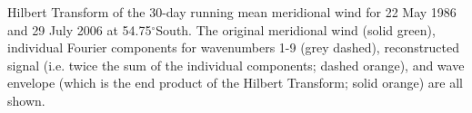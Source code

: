 \label{fig:example_hilbert}
Hilbert Transform of the 30-day running mean meridional wind for 22 May 1986 and 29 July 2006 at 54.75$^{\circ}$South. The original meridional wind (solid green), individual Fourier components for wavenumbers 1-9 (grey dashed), reconstructed signal (i.e. twice the sum of the individual components; dashed orange), and wave envelope (which is the end product of the Hilbert Transform; solid orange) are all shown. 
